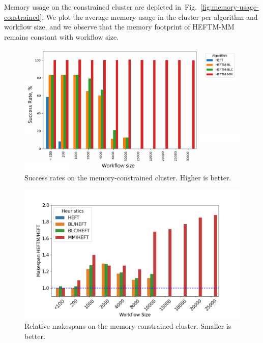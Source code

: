 \documentclass[conference]{IEEEtran}
\newcommand{\algo}[1]{\textsc{#1}}
\newcommand{\heftmm}{\algo{HEFTM-MM}\xspace}
\newcommand{\new}[1]{{\color{blue}#1}}
\begin{document}
%
%
%

Memory usage on the constrained cluster are depicted in~Fig.~\ref{fig:memory-usage-constrained}.
\new{We plot the average memory usage in the cluster per algorithm and workflow size},
and we observe that the memory footprint of \heftmm remains constant with workflow size.


\begin{figure}[tb]
    \centering
    \includegraphics[width=1\columnwidth] {images/success-rates-tiny}
    \caption{Success rates on the memory-constrained cluster. Higher is better. }
    \label{fig:success-rates-tiny}
\end{figure}


\begin{figure}[tb]
    \centering
    \vspace{-0.3cm}
    \includegraphics[width=1\columnwidth] {images/ms_relations_by_wf_size-constrained-barplot}
    \caption{Relative makespans on the memory-constrained cluster.
    Smaller is better.}
    \label{fig:ms-relations-by-workflow-constrained}
\end{figure}
\end{document}
